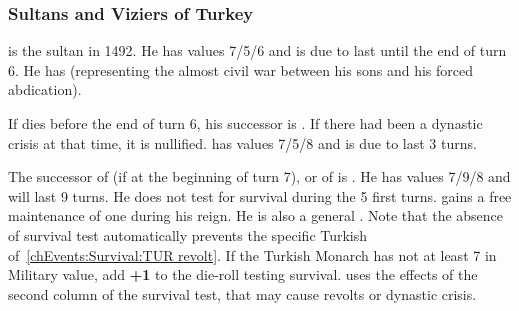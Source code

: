 \subsubsection{Sultans and Viziers of Turkey}
 is the sultan in 1492. He has
values 7/5/6 and is due to last until the end of turn 6.
 He has 
(representing the almost civil war between his sons and his forced
abdication).

 If  dies before
the end of turn 6, his successor is . If there had
been a dynastic crisis at that time, it is nullified. 
has values 7/5/8 and is due to last 3 turns.

 The successor of  (if at the beginning of turn 7), or of  is
. He has values 7/9/8 and will last 9 turns. He does
not test for survival during the 5 first turns. \TUR gains a free
maintenance of one \ARMY\faceplus \Janissaire during his reign. He is
also a general .
\bparag Note that the absence of survival test automatically prevents the
specific Turkish \REVOLT of~\ref{chEvents:Survival:TUR revolt}.
 If the Turkish
Monarch has not at least 7 in Military value, add {\bf +1} to the
die-roll testing survival.
\bparag \TUR uses the effects of the second column of the survival test,
that may cause revolts or dynastic crisis.


